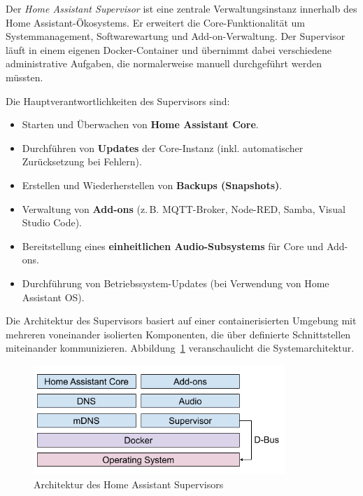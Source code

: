 Der \textit{Home Assistant Supervisor} ist eine zentrale Verwaltungsinstanz innerhalb des Home Assistant-Ökosystems. Er erweitert die Core-Funktionalität um Systemmanagement, Softwarewartung und Add-on-Verwaltung. Der Supervisor läuft in einem eigenen Docker-Container und übernimmt dabei verschiedene administrative Aufgaben, die normalerweise manuell durchgeführt werden müssten.

\vspace{0.5em}
\noindent
Die Hauptverantwortlichkeiten des Supervisors sind:

\begin{itemize}
  \item Starten und Überwachen von \textbf{Home Assistant Core}.\\
  \item Durchführen von \textbf{Updates} der Core-Instanz (inkl. automatischer Zurücksetzung bei Fehlern).\\
  \item Erstellen und Wiederherstellen von \textbf{Backups (Snapshots)}.\\
  \item Verwaltung von \textbf{Add-ons} (z.\,B. MQTT-Broker, Node-RED, Samba, Visual Studio Code).\\
  \item Bereitstellung eines \textbf{einheitlichen Audio-Subsystems} für Core und Add-ons.\\
  \item Durchführung von Betriebssystem-Updates (bei Verwendung von Home Assistant OS).
\end{itemize}

\vspace{0.5em}
\noindent
Die Architektur des Supervisors basiert auf einer containerisierten Umgebung mit mehreren voneinander isolierten Komponenten, die über definierte Schnittstellen miteinander kommunizieren. Abbildung~\ref{fig:ha-supervisor-architecture} veranschaulicht die Systemarchitektur.

\begin{figure}[H]
  \centering
  \includegraphics[width=0.85\textwidth]{images/HA_supervisor_architecture.png}
  \caption{Architektur des Home Assistant Supervisors}
  \label{fig:ha-supervisor-architecture}
\end{figure}

